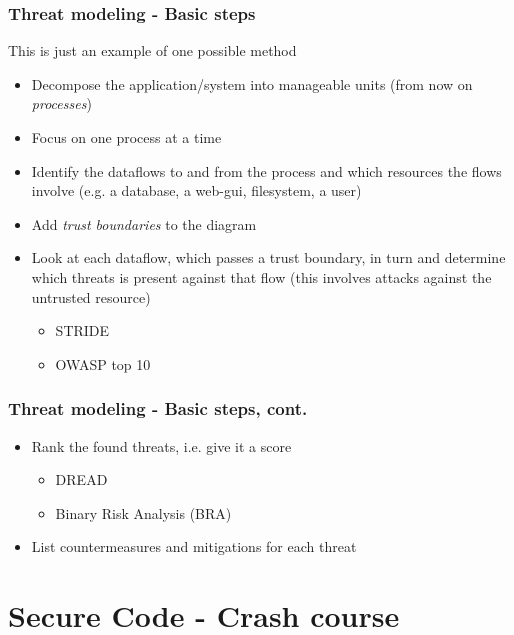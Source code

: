 \documentclass{beamer}
\begin{document}
    \begin{frame}
      \frametitle{Threat modeling - Basic steps}
      This is just an example of one possible method
      \begin{itemize}
        \item Decompose the application/system into manageable units (from now on \textit{processes})
        \item Focus on one process at a time
        \item Identify the dataflows to and from the process and which resources the flows involve (e.g. a database, a web-gui, filesystem, a user)
        \item Add \textit{trust boundaries} to the diagram
        \item Look at each dataflow, which passes a trust boundary, in turn and determine which threats is present against that flow (this involves attacks against the untrusted resource)
        \begin{itemize}
          \item STRIDE
          \item OWASP top 10
        \end{itemize}
      \end{itemize}
    \end{frame}
    \begin{frame}
      \frametitle{Threat modeling - Basic steps, cont.}
      \begin{itemize}
        \item Rank the found threats, i.e. give it a score
        \begin{itemize}
          \item DREAD
          \item Binary Risk Analysis (BRA)
        \end{itemize}
        \item List countermeasures and mitigations for each threat
      \end{itemize}
    \end{frame}

\section{Secure Code - Crash course}
\end{document}
